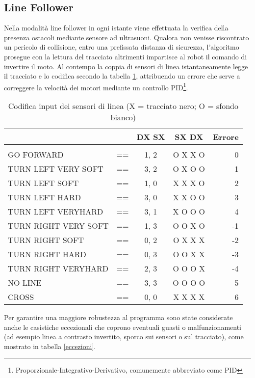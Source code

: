 \subsection{Line Follower}
Nella modalità line follower in ogni istante viene effettuata la verifica della presenza ostacoli mediante sensore ad ultrasuoni.
Qualora non venisse riscontrato un pericolo di collisione, entro una prefissata distanza di sicurezza, l'algoritmo prosegue con la lettura del tracciato altrimenti impartisce al robot il comando di invertire il moto.
Al contempo la coppia di sensori di linea istantaneamente legge il tracciato e lo codifica secondo la tabella \ref{error_normali}, attribuendo un errore che serve a correggere la velocità dei motori mediante un controllo \textsc{PID}\footnote{Proporzionale-Integrativo-Derivativo, comunemente abbreviato come PID}.
\begin{table}[h]\footnotesize
\center
\begin{tabular}{llccr}
\label{normali}
                          			&			&DX  SX&	SX  DX    	& Errore\\
\hline \\
  GO FORWARD          		& ==  	&1, 2  	& O X  X O 	& 0\\%
  TURN LEFT VERY SOFT 	&	==	&	3, 2	&	O X  O O  &	1\\
  TURN LEFT SOFT       	&	==  	&	1,	0	&	X X  X O   &	2\\
  TURN LEFT HARD     		&	==  	&	3, 0	&	X X  O O	&	3\\
  TURN LEFT VERYHARD  &	==  	&	3, 1	&	X O  O O	&	4\\
  TURN RIGHT VERY SOFT&	== 	& 1, 3	&	O O  X O  &	-1\\
  TURN RIGHT SOFT    		&	==  	&	0, 2	& 	O X  X X  	&	-2\\
  TURN RIGHT HARD   		&	== 	&	0, 3	&	O O  X X  	&	-3\\
  TURN RIGHT VERYHARD &	== 	&	2, 3	&	O O  O X	&	-4\\
  NO LINE           				&	== 	&	3, 3	&	O O  O O  &	 5\\
  CROSS              				&	== 	& 0, 0   &	X X  X X   	&  6\\
  \hline
\end{tabular}
\caption{Codifica input dei sensori di linea (X = tracciato nero; O = sfondo bianco)}
\label{error_normali}
\end{table}

\noindent Per garantire una maggiore robustezza al programma sono state considerate anche le casistiche eccezionali che coprono eventuali guasti o malfunzionamenti (ad esempio linea a contrasto invertito, sporco sui sensori o sul tracciato), come mostrato in tabella \ref{eccezioni}.

